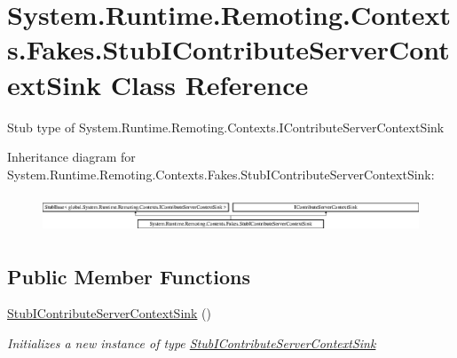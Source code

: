 \hypertarget{class_system_1_1_runtime_1_1_remoting_1_1_contexts_1_1_fakes_1_1_stub_i_contribute_server_context_sink}{\section{System.\-Runtime.\-Remoting.\-Contexts.\-Fakes.\-Stub\-I\-Contribute\-Server\-Context\-Sink Class Reference}
\label{class_system_1_1_runtime_1_1_remoting_1_1_contexts_1_1_fakes_1_1_stub_i_contribute_server_context_sink}
}


Stub type of System.\-Runtime.\-Remoting.\-Contexts.\-I\-Contribute\-Server\-Context\-Sink 


Inheritance diagram for System.\-Runtime.\-Remoting.\-Contexts.\-Fakes.\-Stub\-I\-Contribute\-Server\-Context\-Sink\-:\begin{figure}[H]
\begin{center}
\leavevmode
\includegraphics[height=1.120000cm]{class_system_1_1_runtime_1_1_remoting_1_1_contexts_1_1_fakes_1_1_stub_i_contribute_server_context_sink}
\end{center}
\end{figure}
\subsection*{Public Member Functions}
\begin{DoxyCompactItemize}
\item 
\hyperlink{class_system_1_1_runtime_1_1_remoting_1_1_contexts_1_1_fakes_1_1_stub_i_contribute_server_context_sink_ad3edd44430dd20bd656b134c3f98c8eb}{Stub\-I\-Contribute\-Server\-Context\-Sink} ()
\begin{DoxyCompactList}\small\item\em Initializes a new instance of type \hyperlink{class_system_1_1_runtime_1_1_remoting_1_1_contexts_1_1_fakes_1_1_stub_i_contribute_server_context_sink}{Stub\-I\-Contribute\-Server\-Context\-Sink}\end{DoxyCompactList}\end{DoxyCompactItemize}

